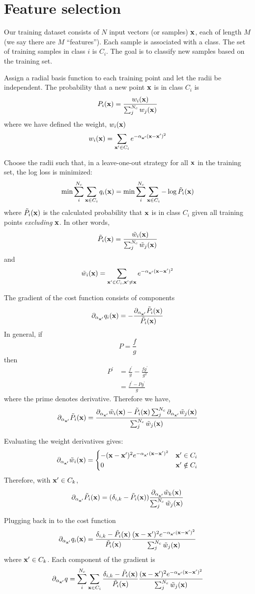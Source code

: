\documentclass{article}
\newcommand{\bx}{{\bf x}}
\newcommand{\bxp}{\bx^{\prime}}
\newcommand{\alphaxp}{\alpha_{\bxp}}
\newcommand{\tw}{\tilde{w}}
\begin{document}
\section*{Feature selection}


Our training dataset consists of $N$ input vectors (or samples) $\bx$,
each of length $M$ (we say there are $M$ ``features''). Each sample is
associated with a class. The set of training samples in class $i$ is $C_i$.
The goal is to classify new samples based on the training set.

Assign a radial basis function to each training point and let the
radii be independent. The probability that a new point $\bx$ is in
class $C_i$ is
\[
P_i(\bx) = \frac{w_i(\bx)}{\sum_j^{N_c} w_j(\bx)}
\]
where we have defined the weight, $w_i(\bx)$
\[
w_i(\bx) = \sum_{\bxp \in C_i} e^{-\alphaxp (\bx - \bxp)^2}
\]

Choose the radii such that, in a leave-one-out
strategy for all $\bx$ in the training set, the log loss is minimized:
\[
\min \sum_{i}^{N_c} \sum_{\bx \in C_i}  q_i(\bx) = \min \sum_{i}^{N_c} \sum_{\bx \in C_i} -\log \tilde{P}_i(\bx)
\]
where
$\tilde{P}_i(\bx)$ is the calculated probability that $\bx$ is in
class $C_i$ given all training points {\it excluding} $\bx$. In other words,
\[
\tilde{P}_i(\bx) = \frac{\tilde{w}_i(\bx)}{\sum_j^{N_c} \tilde{w}_j(\bx)}
\]
and
\[
\tilde{w}_i(\bx) =
\sum_{\bxp \in C_i, \bxp \neq \bx} e^{-\alphaxp (\bx - \bxp)^2}
\]

The gradient of the cost function consists of components
\[
\partial_{\alphaxp} q_i(\bx) = -\frac{\partial_{\alphaxp} \tilde{P}_i(\bx)}
{\tilde{P}_i(\bx)}
\]
In general, if
\[
P = \frac{f}{g}
\]
then
\begin{align*}
P^{\prime}
	&= \frac{f^{\prime}}{g} - \frac{f g^{\prime}}{g^2} \\
	&= \frac{f^{\prime} - P g^{\prime}}{g}
\end{align*}
where the prime denotes derivative. Therefore we have,
\[
\partial_{\alphaxp} \tilde{P}_i(\bx) =
\frac{\partial_{\alphaxp} \tw_i(\bx) - \tilde{P}_i(\bx) \sum_j^{N_c} \partial_{\alphaxp} \tw_j(\bx)}{\sum_j^{N_c} \tw_j(\bx)}
\]

Evaluating the weight derivatives gives:
\[
\partial_{\alphaxp} \tw_i(\bx) =
\begin{cases}
-(\bx - \bxp)^2 e^{-\alphaxp (\bx-\bxp)^2} & \bxp \in C_i \\
0 & \bxp \notin C_i
\end{cases}
\]
Therefore,
with $\bxp \in C_k$,
\[
\partial_{\alphaxp} \tilde{P}_i(\bx) =
(\delta_{i,k} - \tilde{P}_i(\bx)) \frac{\partial_{\alphaxp} \tw_k(\bx)}{\sum_j^{N_c} \tw_j(\bx)}
\]

Plugging back in to the cost function
\[
\partial_{\alphaxp} q_i(\bx) =
\frac{\delta_{i,k} - \tilde{P}_i(\bx)}{\tilde{P}_i(\bx)}
\frac{(\bx - \bxp)^2 e^{-\alphaxp (\bx - \bxp)^2}}{\sum_j^{N_c} \tw_j(\bx)}
\]
where $\bxp \in C_k$. Each component of the gradient is
\[
\partial_{\alphaxp} q =
\sum_{i}^{N_c} \sum_{\bx \in C_i}
\frac{\delta_{i,k} - \tilde{P}_i(\bx)}{\tilde{P}_i(\bx)}
\frac{(\bx - \bxp)^2 e^{-\alphaxp (\bx - \bxp)^2}}{\sum_j^{N_c} \tw_j(\bx)}
\]
\end{document}
